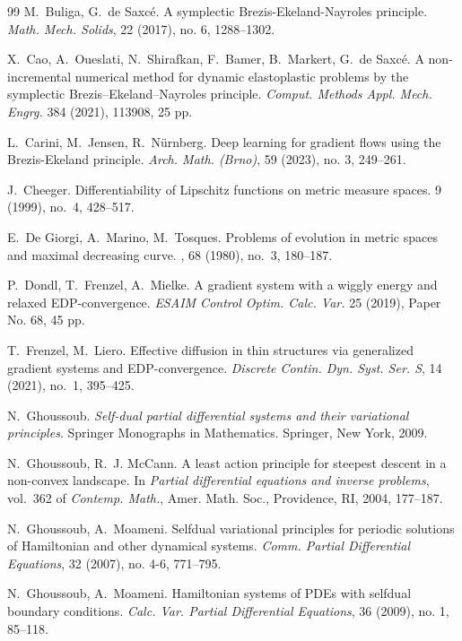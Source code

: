 \documentclass[reqno]{amsart}
\begin{document}
\begin{thebibliography}{99}
M.~Buliga, G.~de Saxc\'e. A symplectic Brezis-Ekeland-Nayroles
principle. {\it  Math. Mech. Solids}, 22 (2017), no. 6, 1288--1302.

X.~Cao, A.~Oueslati, N.~Shirafkan, F.~Bamer, B.~Markert, G.~de
Saxc\'e. A non-incremental numerical method for dynamic elastoplastic
problems by the symplectic Brezis--Ekeland--Nayroles principle. {\it Comput. Methods Appl. Mech. Engrg.} 384 (2021), 113908, 25 pp.

L.~Carini, M.~Jensen, R.~N\"urnberg. Deep learning for gradient flows
using the Brezis-Ekeland principle. {\it Arch. Math. (Brno)}, 59
(2023), no. 3, 249--261.

J.~Cheeger.
\newblock Differentiability of {L}ipschitz functions on metric measure spaces.
 9 (1999),  no.~4,  428--517.

E.~De Giorgi, A.~Marino, M.~Tosques.
\newblock Problems of evolution in metric spaces and maximal decreasing curve.
,
  68 (1980),  no.~3,  180--187.

  P.~Dondl, T.~Frenzel, A.~Mielke. A gradient system with a wiggly
  energy and relaxed EDP-convergence. {\it ESAIM Control
    Optim. Calc. Var.} 25 (2019), Paper No. 68, 45 pp.

 T.~Frenzel, M.~Liero. Effective diffusion in thin structures via
 generalized gradient systems and EDP-convergence. {\it Discrete
   Contin. Dyn. Syst. Ser. S}, 14 (2021), no.~1, 395--425.

N.~Ghoussoub. {\it Self-dual partial differential systems and their variational principles}. Springer Monographs in Mathematics. Springer, New York, 2009. 
 
{N.~Ghoussoub, R.~J. McCann}. {A least action principle for steepest
  descent in a non-convex landscape}. In {\it Partial differential equations and
  inverse problems}, vol.~362 of {\it Contemp. Math.},
Amer. Math. Soc., Providence, RI, 2004, 177--187.

N.~Ghoussoub, A.~Moameni. Selfdual variational principles for periodic
solutions of Hamiltonian and other dynamical systems. {\it
  Comm. Partial Differential Equations}, 32 (2007), no. 4-6,
771--795.

N.~Ghoussoub, A.~Moameni. Hamiltonian systems of PDEs with selfdual
boundary conditions. {\it Calc. Var. Partial Differential Equations},
36 (2009), no. 1, 85--118.


\end{thebibliography}
\end{document}
